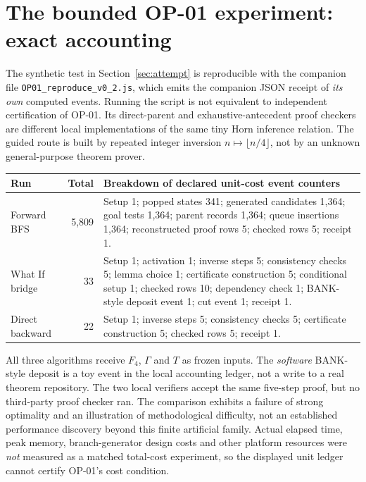 \documentclass[11pt,letterpaper,oneside]{article}
\begin{document}
\section{The bounded OP-01 experiment: exact accounting}\label{app:ledger}
The synthetic test in Section~\ref{sec:attempt} is reproducible with the companion file \texttt{OP01\_reproduce\_v0\_2.js}, which emits the companion JSON receipt of \emph{its own} computed events. Running the script is not equivalent to independent certification of OP-01. Its direct-parent and exhaustive-antecedent proof checkers are different local implementations of the same tiny Horn inference relation. The guided route is built by repeated integer inversion $n\mapsto\lfloor n/4\rfloor$, not by an unknown general-purpose theorem prover.

\begin{center}\small
\begin{tabularx}{\textwidth}{@{}p{2.32in}rX@{}}
\toprule
Run & Total & Breakdown of declared unit-cost event counters\\\midrule
Forward BFS & 5,809 & Setup 1; popped states 341; generated candidates 1,364; goal tests 1,364; parent records 1,364; queue insertions 1,364; reconstructed proof rows 5; checked rows 5; receipt 1.\\
What If bridge & 33 & Setup 1; activation 1; inverse steps 5; consistency checks 5; lemma choice 1; certificate construction 5; conditional setup 1; checked rows 10; dependency check 1; BANK-style deposit event 1; cut event 1; receipt 1.\\
Direct backward & 22 & Setup 1; inverse steps 5; consistency checks 5; certificate construction 5; checked rows 5; receipt 1.\\\bottomrule
\end{tabularx}
\end{center}

All three algorithms receive $F_4$, $\Gamma$ and $T$ as frozen inputs. The \emph{software} BANK-style deposit is a toy event in the local accounting ledger, not a write to a real theorem repository. The two local verifiers accept the same five-step proof, but no third-party proof checker ran. The comparison exhibits a failure of strong optimality and an illustration of methodological difficulty, not an established performance discovery beyond this finite artificial family. Actual elapsed time, peak memory, branch-generator design costs and other platform resources were \emph{not} measured as a matched total-cost experiment, so the displayed unit ledger cannot certify OP-01's cost condition.
\end{document}
